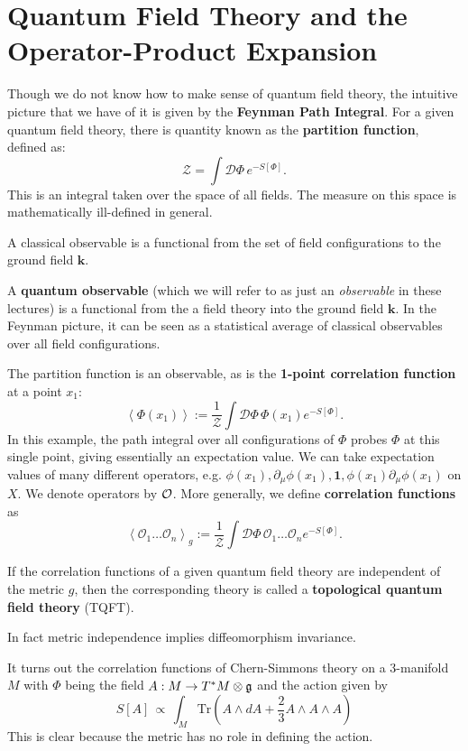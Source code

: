 	\section{Quantum Field Theory and the Operator-Product Expansion} %
	\label{sec:quantum_field_theory_and_the_operator_product_expansion}
	
		Though we do not know how to make sense of quantum field theory, the intuitive picture that we have of it is given by the \textbf{Feynman Path Integral}. For a given quantum field theory, there is quantity known as the \textbf{partition function}, defined as:
		\begin{equation}
			\mathcal Z = \int \mathcal D\Phi\, e^{- S[\Phi]}.
		\end{equation}
		This is an integral taken over the space of all fields. The measure on this space is mathematically ill-defined in general. 
		\begin{defn}
			A classical observable is a functional from the set of field configurations to the ground field $\mathbf k$.
		\end{defn}
		\begin{defn}[Observable]
			A \textbf{quantum observable} (which we will refer to as just an \emph{observable} in these lectures) is a functional from the a field theory into the ground field $\mathbf k$. In the Feynman picture, it can be seen as a statistical average of classical observables over all field configurations.
		\end{defn}
		The partition function is an observable, as is the \textbf{1-point correlation function} at a point $x_1$:
		$$\left< \Phi(x_1) \right> := \frac{1}{\mathcal Z} \int \mathcal D\Phi \, \Phi(x_1) e^{-S[\Phi]}.$$
		In this example, the path integral over all configurations of $\Phi$ probes $\Phi$ at this single point, giving essentially an expectation value. We can take expectation values of many different operators, e.g. $\phi(x_1), \partial_\mu \phi(x_1), \mathbf{1}, \phi(x_1) \partial_\mu \phi(x_1)$ on $X$. We denote operators by $\mathcal O$. More generally, we define \textbf{correlation functions} as 
		$$\left< \mathcal O_1 \dots \mathcal O_n \right>_g := \frac{1}{\mathcal Z} \int \mathcal D\Phi \, \mathcal O_1 \dots \mathcal O_n e^{-S[\Phi]}.$$
		\begin{defn}[TQFT]
			If the correlation functions of a given quantum field theory are independent of the metric $g$, then the corresponding theory is called a \textbf{topological quantum field theory} (TQFT).
		\end{defn}
	\noindent 	In fact metric independence implies diffeomorphism invariance.
		\begin{eg}
			It turns out the correlation functions of Chern-Simmons theory on a 3-manifold $M$ with $\Phi$ being the field $A: M \to T^* M \otimes \frak g$ and the action given by
			$$S[A] \, \propto\,  \int_{M} \mathrm{Tr}\left(A \wedge dA + \frac23 A \wedge A \wedge A \right)$$
			This is clear because the metric has no role in defining the action.
		\end{eg}

